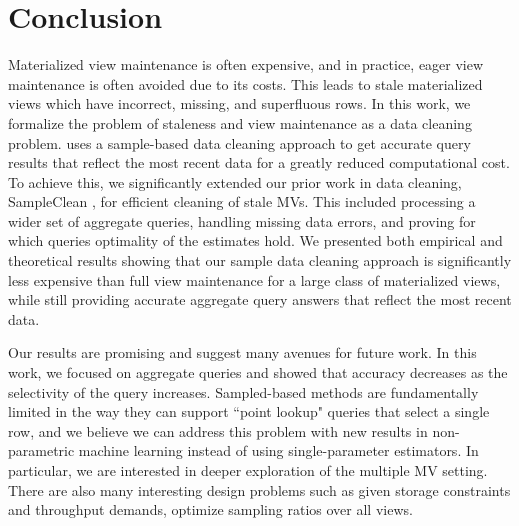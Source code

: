 \section{Conclusion}\label{conclusion}
\vspace{-.3em}
Materialized view maintenance is often expensive, and in practice, eager view maintenance is often avoided due to its costs.
This leads to stale materialized views which have incorrect, missing, and superfluous rows.
In this work, we formalize the problem of staleness and view maintenance as a data cleaning problem.
\svc uses a sample-based data cleaning approach to get accurate query results that reflect the most recent data for a greatly reduced computational cost.
To achieve this, we significantly extended our prior work in data cleaning, SampleClean \cite{wang1999sample}, for efficient cleaning of stale MVs. 
This included processing a wider set of aggregate queries, handling missing data errors, and proving for which queries optimality of the estimates hold.
We presented both empirical and theoretical results showing that our sample data cleaning approach is significantly less expensive than full view maintenance for a large class of materialized views, while still providing accurate aggregate query answers that reflect the most recent data.

Our results are promising and suggest many avenues for future work.
In this work, we focused on aggregate queries and showed that accuracy decreases as the selectivity of the query increases.
Sampled-based methods are fundamentally limited in the way they can support ``point lookup" queries that select a single row, and we believe we can address this problem with new results in non-parametric machine learning instead of using single-parameter estimators.
In particular, we are interested in deeper exploration of the multiple MV setting.
There are also many interesting design problems such as given storage constraints and throughput demands, optimize sampling ratios over all views.






